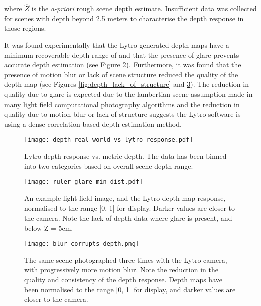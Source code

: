 \noindent
where $\hat{Z}$ is the \emph{a-priori} rough scene depth estimate.
Insufficient data was collected for scenes with depth beyond 2.5 meters to characterise the depth response in those regions.

It was found experimentally that the Lytro-generated depth maps have a minimum recoverable depth range of  and that the presence of glare prevents accurate depth estimation (see Figure \ref{fig:ruler_glare_min_dist}).
Furthermore, it was found that the presence of motion blur or lack of scene structure reduced the quality of the depth map (see Figures \ref{fig:depth_lack_of_structure} and \ref{fig:blur_corrupts_depth}).
The reduction in quality due to glare is expected due to the lambertian scene assumption made in many light field computational photography algorithms \cite{bishop2009light, liang2011light, baker2003shape} and the reduction in quality due to motion blur or lack of structure suggests the Lytro software is using a dense correlation based depth estimation method.

\begin{figure}[p]
\centering
\texttt{[image: depth\_real\_world\_vs\_lytro\_response.pdf]}
\caption[Lytro depth response vs. metric depth]{
Lytro depth response vs. metric depth.
The data has been binned into two categories based on overall scene depth range.
}
\label{fig:depth_real_world_vs_lytro_response}
\end{figure}

\begin{figure}[p]
\centering
\texttt{[image: ruler\_glare\_min\_dist.pdf]}
\caption[Minimum depth map distance and the effect of glare]{
An example light field image, and the Lytro depth map response, normalised to the range [0, 1] for display.
Darker values are closer to the camera.
Note the lack of depth data where glare is present, and below Z = 5cm.
}
\label{fig:ruler_glare_min_dist}
\end{figure}

\begin{figure}
\centering
\texttt{[image: blur\_corrupts\_depth.png]}
\caption[Motion Blur Corrupts Lytro Depth Estimation]{
The same scene photographed three times with the Lytro camera, with progressively more motion blur.
Note the reduction in the quality and consistency of the depth response.
Depth maps have been normalised to the range [0, 1] for display, and darker values are closer to the camera.
}
\label{fig:blur_corrupts_depth}
\end{figure}

